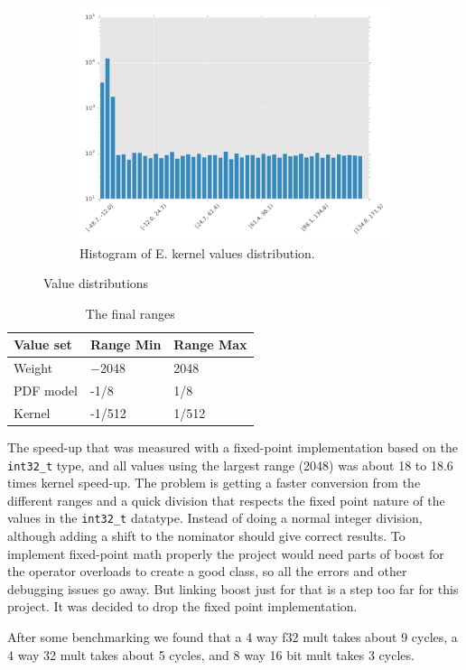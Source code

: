 \documentclass[final]{article}
\begin{document}
\begin{figure}[H]
\begin{subfigure}[b]{0.32\textwidth}
        \includegraphics[width=\textwidth]{resources/histogramE}
        \caption{Histogram of E. kernel values distribution.}
    \end{subfigure}
    \caption{Value distributions}
    \label{fig:value-distributions}
\end{figure}

\begin{table}[H]
    \centering
    \caption{The final ranges}
    \label{tab:final-ranges}
    \begin{tabular}{lll}
        \toprule
        \textbf{Value set} & \textbf{Range Min} & \textbf{Range Max} \\
        \midrule
        Weight      &  \num{-2048}  &  \num{2048}     \\
        PDF model   &  \num{-1/8}   &  \num{1/8}      \\
        Kernel      &  \num{-1/512} &  \num{1/512}    \\
        \bottomrule
    \end{tabular}
\end{table}

The speed-up that was measured with a fixed-point implementation based on the \texttt{int32\_t} type, and all values using the largest range (\num{2048}) was about \num{18} to \num{18.6} times kernel speed-up.
The problem is getting a faster conversion from the different ranges and a quick division that respects the fixed point nature of the values in the \texttt{int32\_t} datatype.
Instead of doing a normal integer division, although adding a shift to the nominator should give correct results.
To implement fixed-point math properly the project would need parts of boost for the operator overloads to create a good class, so all the errors and other debugging issues go away.
But linking boost just for that is a step too far for this project.
It was decided to drop the fixed point implementation.

After some benchmarking we found that a 4 way f32 mult takes about 9 cycles, a 4 way 32 mult takes about 5 cycles, and 8 way 16 bit mult takes 3 cycles.
\end{document}
